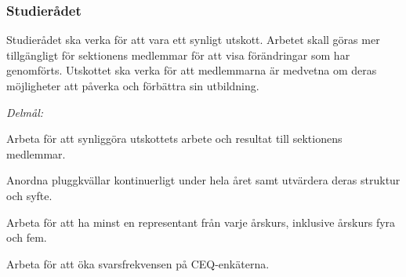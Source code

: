 \documentclass[../_main/handlingar.tex]{subfiles}
\begin{document}
\subsubsection*{Studierådet}
Studierådet ska verka för att vara ett synligt utskott. Arbetet skall göras mer tillgängligt för sektionens medlemmar för att visa förändringar som har genomförts. Utskottet ska verka för att medlemmarna är medvetna om deras möjligheter att påverka och förbättra sin utbildning.

\emph{Delmål:}
\begin{dashlist}
	\item Arbeta för att synliggöra utskottets arbete och resultat till sektionens medlemmar.
	\item Anordna pluggkvällar kontinuerligt under hela året samt utvärdera deras struktur och syfte.
	\item Arbeta för att ha minst en representant från varje årskurs, inklusive årskurs fyra och fem.
	\item Arbeta för att öka svarsfrekvensen på CEQ-enkäterna.
\end{dashlist}

\newpage
\end{document}
